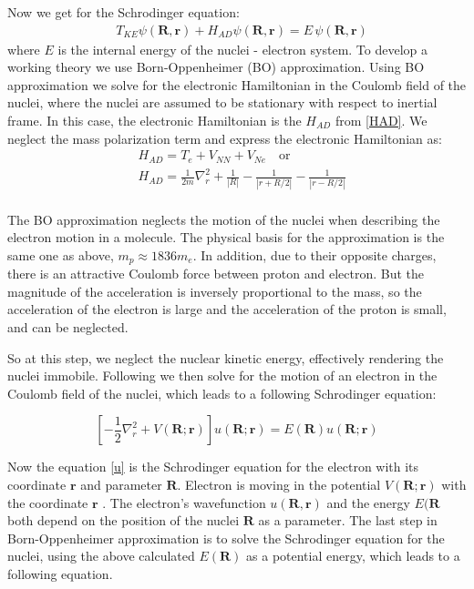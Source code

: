 Now we get for the Schrodinger equation:
\begin{equation}
\begin{split}
& T_{KE}\psi(\mathbf{R},\mathbf{r}) + H_{AD}\psi(\mathbf{R},\mathbf{r}) = E \, \psi(\mathbf{R},\mathbf{r})
\end{split}
\end{equation}
where $ E $ is the internal energy of the nuclei - electron system. To develop a working theory we use Born-Oppenheimer (BO) approximation. Using BO approximation we solve for the electronic Hamiltonian in the Coulomb field of the nuclei, where the nuclei are assumed to be stationary with respect to inertial frame. In this case, the electronic Hamiltonian is the $ H_{AD} $ from \eqref{HAD}. We neglect the mass polarization term and express the electronic Hamiltonian as:
\begin{equation}\label{HAD2}
\begin{split}
& H_{AD} = T_e + V_{NN} + V_{Ne}\,\,\,\,\text{ or }\\[.8em]
& H_{AD} = \frac{1}{2m}\nabla_r^2 + \frac{1}{\left|R\right|} - \frac{1}{\left|r + R/2\right|} - \frac{1}{\left|r - R/2\right|} \\[.8em]
\end{split}
\end{equation}

The BO approximation neglects the motion of the nuclei when describing the electron motion in a molecule. The physical basis for the approximation is the same one as above, $ m_p \approx 1836 m_e $. In addition, due to their opposite charges, there is an attractive Coulomb force between proton and electron. But the magnitude of the acceleration is inversely proportional to the mass, so the acceleration of the electron is large and the acceleration of the  proton is small, and can be neglected.

So at this step, we neglect the nuclear kinetic energy, effectively rendering the nuclei immobile. Following \cite{Slater} we then solve for the motion of an electron in the Coulomb field of the nuclei, which leads to a following Schrodinger equation:

\begin{equation}\label{u}
\left[ -\frac{1}{2}\nabla_r^2 + V(\mathbf{R};\mathbf{r}) \right] u( \mathbf{R}; \mathbf{r} ) = E( \mathbf{R} ) u( \mathbf{R}; \mathbf{r} ) 
\end{equation}

Now the equation \eqref{u} is the Schrodinger equation for the electron with its coordinate $ \textbf{r} $ and parameter $ \textbf{R} $. Electron is moving in the potential $ V(\mathbf{R};\mathbf{r})$ with the coordinate $ \mathbf{r} $ .  The electron's wavefunction $ u( \mathbf{R},\mathbf{r} ) $ and the energy $ E(\mathbf{R} $ both depend on the position of the nuclei $ \mathbf{R} $ as a parameter. The last step in Born-Oppenheimer approximation is to solve the Schrodinger equation for the nuclei, using the above calculated $ E(\mathbf{R}) $ as a potential energy, which leads to a following equation.

